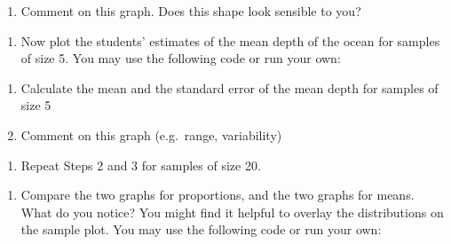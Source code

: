 \documentclass[letterpaper,9pt,twoside,printwatermark=false]{pinp}
\providecommand{\tightlist}{%
  \setlength{\itemsep}{0pt}\setlength{\parskip}{0pt}}
\begin{document}
\begin{enumerate}
\def\labelenumi{\alph{enumi})}
\tightlist
\item
  Comment on this graph. Does this shape look sensible to you?
\end{enumerate}

\begin{enumerate}
\def\labelenumi{\arabic{enumi}.}
\setcounter{enumi}{2}
\tightlist
\item
  Now plot the students' estimates of the mean depth of the ocean for
  samples of size 5. You may use the following code or run your own:
\end{enumerate}

\begin{Shaded}
\begin{Highlighting}[]
\StringTok{ }\NormalTok{(}\NormalTok{,}\NormalTok{,}\NormalTok{)}
\NormalTok{(water_results[,}\NormalTok{], }
      \NormalTok{(}\NormalTok{,}\NormalTok{),}
      \NormalTok{(}\OperatorTok{/}\NormalTok{), }
      \NormalTok{,}
      \NormalTok{)}
\end{Highlighting}
\end{Shaded}

\begin{enumerate}
\def\labelenumi{\alph{enumi})}
\tightlist
\item
  Calculate the mean and the standard error of the mean depth for
  samples of size 5
\item
  Comment on this graph (e.g.~range, variability)
\end{enumerate}

\begin{enumerate}
\def\labelenumi{\arabic{enumi}.}
\setcounter{enumi}{3}
\tightlist
\item
  Repeat Steps 2 and 3 for samples of size 20.
\end{enumerate}

\begin{enumerate}
\def\labelenumi{\alph{enumi})}
\tightlist
\item
  Compare the two graphs for proportions, and the two graphs for means.
  What do you notice? You might find it helpful to overlay the
  distributions on the sample plot. You may use the following code or
  run your own:
\end{enumerate}
\end{document}
